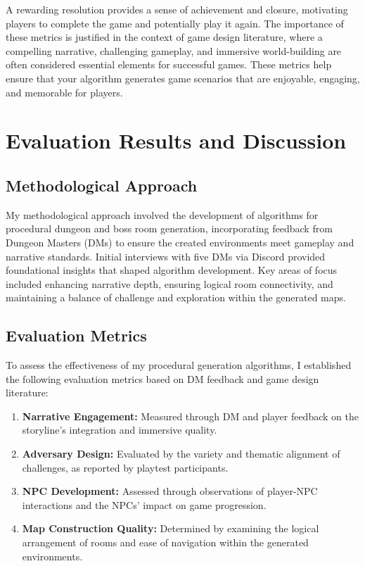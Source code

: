 \documentclass[10pt,twocolumn]{article}
\begin{document}
A rewarding resolution provides a sense of achievement and closure, motivating players to complete the game and potentially play it again.
The importance of these metrics is justified in the context of game design literature, where a compelling narrative, challenging gameplay, and immersive world-building are often considered essential elements for successful games. These metrics help ensure that your algorithm generates game scenarios that are enjoyable, engaging, and memorable for players.



\section{Evaluation Results and Discussion}

\subsection{Methodological Approach}

My methodological approach involved the development of algorithms for procedural dungeon and boss room generation, incorporating feedback from Dungeon Masters (DMs) to ensure the created environments meet gameplay and narrative standards. Initial interviews with five DMs via Discord provided foundational insights that shaped algorithm development. Key areas of focus included enhancing narrative depth, ensuring logical room connectivity, and maintaining a balance of challenge and exploration within the generated maps.

\subsection{Evaluation Metrics}

To assess the effectiveness of my procedural generation algorithms, I established the following evaluation metrics based on DM feedback and game design literature:

\begin{enumerate}
    \item \textbf{Narrative Engagement:} Measured through DM and player feedback on the storyline's integration and immersive quality.
    \item \textbf{Adversary Design:} Evaluated by the variety and thematic alignment of challenges, as reported by playtest participants.
    \item \textbf{NPC Development:} Assessed through observations of player-NPC interactions and the NPCs' impact on game progression.
    \item \textbf{Map Construction Quality:} Determined by examining the logical arrangement of rooms and ease of navigation within the generated environments.
\end{enumerate}
\end{document}

